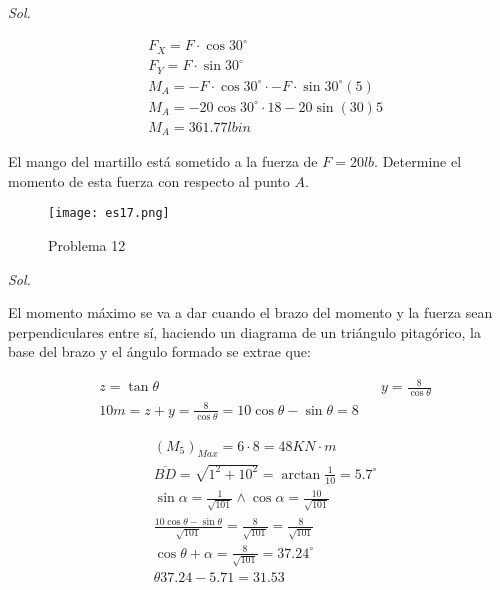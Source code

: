 \textit{ Sol.}

\begin{align*}
	 & F_X=F\cdot \cos{30^{\circ}}                                  \\
	 & F_Y=F\cdot \sin{30^{\circ}}                                  \\
	 & M_A=-F\cdot \cos{30^{\circ}}\cdot-F\cdot \sin{30^{\circ}}(5) \\
	 & M_A=-20\cos{30^{\circ}}\cdot 18-20\sin{(30)5}                \\
	 & M_A=361.77lbin
\end{align*}



\begin{problem}
El mango del martillo está sometido a la fuerza de $F=20 lb.$ Determine el momento de esta fuerza con respecto al punto $A$.
\end{problem}

\begin{figure}[h!]
	\centering
	\texttt{[image: es17.png]}
	\caption{Problema 12}
\end{figure}

\textit{ Sol.}

El momento máximo se va a dar cuando el brazo del momento y la fuerza sean perpendiculares entre sí, haciendo un diagrama de un triángulo pitagórico, la base del brazo y el ángulo formado se extrae que:

\begin{align*}
	 & z=\tan{\theta}                                               &  & y=\frac{8}{\cos{\theta}} \\
	 & 10m=z+y=\frac{8}{\cos{\theta}}=10\cos{\theta}-\sin{\theta}=8
\end{align*}

\begin{align*}
	 & (M_5)_{Max}=6\cdot 8=48 KN\cdot m                                                        \\
	 & \overline{BD}=\sqrt{1^2+10^2}=\arctan{\frac{1}{10}}=5.7^{\circ}                          \\
	 & \sin{\alpha}=\frac{1}{\sqrt{101}}\land \cos{\alpha}=\frac{10}{\sqrt{101}}                \\
	 & \frac{10\cos{\theta}-\sin{\theta}}{\sqrt{101}}=\frac{8}{\sqrt{101}}=\frac{8}{\sqrt{101}} \\
	 & \cos{\theta+\alpha}=\frac{8}{\sqrt{101}}=37.24^{\circ}                                   \\
	 & \theta37.24-5.71=31.53
\end{align*}



